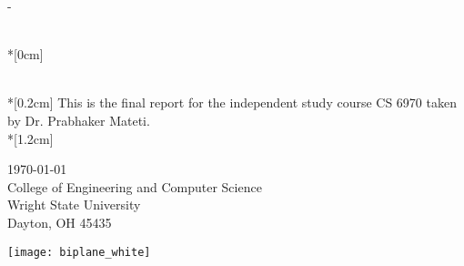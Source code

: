 \thispagestyle{empty}             %
\calccentering{\unitlength}
\begin{adjustwidth*}{\unitlength}{-\unitlength}
    \begin{adjustwidth}{-0.5cm}{-0.5cm}
        \sffamily
        \begin{flushright}
            \thesistypeabbr{} \\*[0cm]
            \thesistype{}\\
        \end{flushright}
        \vspace*{\fill}
        \noindent
        \HUGE \thesistitle{}\\*[0.2cm]
        \LARGE This is the final report for the independent study course CS 6970 taken by Dr. Prabhaker Mateti.\\*[1.2cm]
        \parbox[b]{1.0\linewidth}{%
            \LARGE 
            \thesislocation{} \today \\
            College of Engineering and Computer Science\\
            Wright State University\\
            Dayton, OH 45435\\
        }
        \hfill\texttt{[image: biplane\_white]}
    \end{adjustwidth}
\end{adjustwidth*}
\normalfont
\normalsize